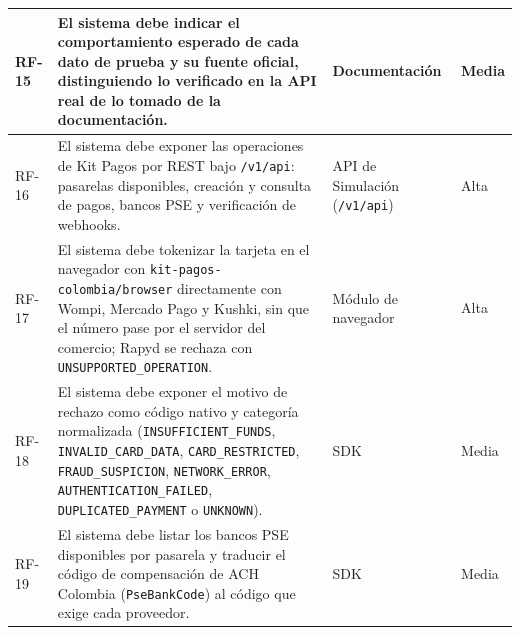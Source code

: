 \begin{longtable}{|l|>{\raggedright\arraybackslash}p{}|>{\raggedright\arraybackslash}p{}|l|}
RF-15 & El sistema debe indicar el comportamiento esperado de cada dato de prueba y su fuente oficial, distinguiendo lo verificado en la API real de lo tomado de la documentación. & Documentación & Media \\ \hline
RF-16 & El sistema debe exponer las operaciones de Kit Pagos por REST bajo \texttt{/v1/api}: pasarelas disponibles, creación y consulta de pagos, bancos PSE y verificación de webhooks. & API de Simulación (\texttt{/v1/api}) & Alta \\ \hline
RF-17 & El sistema debe tokenizar la tarjeta en el navegador con \texttt{kit-pagos-colombia/browser} directamente con Wompi, Mercado Pago y Kushki, sin que el número pase por el servidor del comercio; Rapyd se rechaza con \texttt{UNSUPPORTED\_OPERATION}. & Módulo de navegador & Alta \\ \hline
RF-18 & El sistema debe exponer el motivo de rechazo como código nativo y categoría normalizada (\texttt{INSUFFICIENT\_FUNDS}, \texttt{INVALID\_CARD\_DATA}, \texttt{CARD\_RESTRICTED}, \texttt{FRAUD\_SUSPICION}, \texttt{NETWORK\_ERROR}, \texttt{AUTHENTICATION\_FAILED}, \texttt{DUPLICATED\_PAYMENT} o \texttt{UNKNOWN}). & SDK & Media \\ \hline
RF-19 & El sistema debe listar los bancos PSE disponibles por pasarela y traducir el código de compensación de ACH Colombia (\texttt{PseBankCode}) al código que exige cada proveedor. & SDK & Media \\ \hline
\end{longtable}
\endgroup

